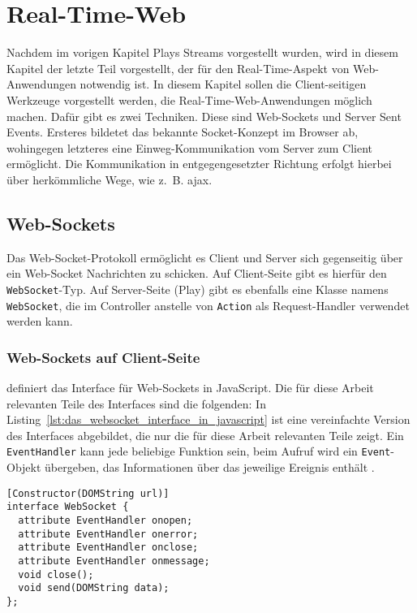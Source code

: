 
\chapter{Real-Time-Web} %
\label{cha:real_time_web}

Nachdem im vorigen Kapitel Plays Streams vorgestellt wurden, wird in diesem Kapitel der letzte Teil vorgestellt, der für den Real-Time-Aspekt von Web-Anwendungen notwendig ist.
In diesem Kapitel sollen die Client-seitigen Werkzeuge vorgestellt werden, die Real-Time-Web-Anwendungen möglich machen.
Dafür gibt es zwei Techniken.
Diese sind Web-Sockets und Server Sent Events.
Ersteres bildetet das bekannte Socket-Konzept im Browser ab, wohingegen letzteres eine Einweg-Kommunikation vom Server zum Client ermöglicht.
Die Kommunikation in entgegengesetzter Richtung erfolgt hierbei über herkömmliche Wege, wie z.~B. \gls{ajax}.

\section{Web-Sockets} %
\label{sec:web_sockets}

Das Web-Socket-Protokoll ermöglicht es Client und Server sich gegenseitig über ein Web-Socket Nachrichten zu schicken.
Auf Client-Seite gibt es hierfür den \lstinline|WebSocket|-Typ.
Auf Server-Seite (Play) gibt es ebenfalls eine Klasse namens \lstinline|WebSocket|, die im Controller anstelle von \lstinline|Action| als Request-Handler verwendet werden kann.

\subsection{Web-Sockets auf Client-Seite} %
\label{sub:web_sockets_auf_client_seite}

\citealt{js_websockets} definiert das Interface für Web-Sockets in JavaScript.
Die für diese Arbeit relevanten Teile des Interfaces sind die folgenden:
In Listing~\ref{lst:das_websocket_interface_in_javascript} ist eine vereinfachte Version des Interfaces abgebildet, die nur die für diese Arbeit relevanten Teile zeigt.
Ein \lstinline|EventHandler| kann jede beliebige Funktion sein, beim Aufruf wird ein \lstinline|Event|-Objekt übergeben, das Informationen über das jeweilige Ereignis enthält \cite[vgl.][]{js_eventhandler}.

\begin{lstlisting}[language=idl, caption=Das WebSocket-Interface in JavaScript, label=lst:das_websocket_interface_in_javascript]
[Constructor(DOMString url)]
interface WebSocket {
  attribute EventHandler onopen;
  attribute EventHandler onerror;
  attribute EventHandler onclose;
  attribute EventHandler onmessage;
  void close();
  void send(DOMString data);
};
\end{lstlisting}

